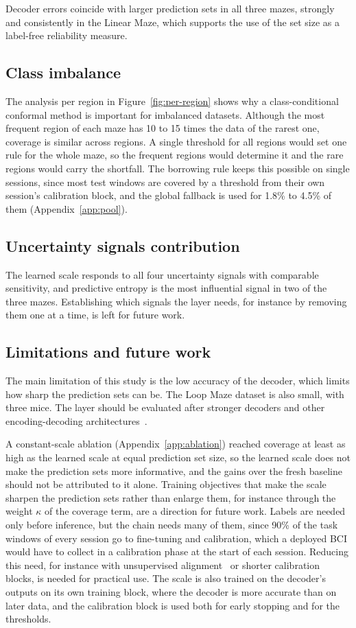 \documentclass{article}
\begin{document}
Decoder errors coincide with larger prediction sets in all three mazes, strongly and consistently in the Linear Maze, which supports the use of the set size as a label-free reliability measure.

\subsection{Class imbalance}
The analysis per region in Figure~\ref{fig:per-region} shows why a class-conditional conformal method is important for imbalanced datasets. Although the most frequent region of each maze has 10 to 15 times the data of the rarest one, coverage is similar across regions. A single threshold for all regions would set one rule for the whole maze, so the frequent regions would determine it and the rare regions would carry the shortfall. The borrowing rule keeps this possible on single sessions, since most test windows are covered by a threshold from their own session's calibration block, and the global fallback is used for 1.8\% to 4.5\% of them (Appendix~\ref{app:pool}).

\subsection{Uncertainty signals contribution}
The learned scale responds to all four uncertainty signals with comparable sensitivity, and predictive entropy is the most influential signal in two of the three mazes. Establishing which signals the layer needs, for instance by removing them one at a time, is left for future work.

\subsection{Limitations and future work}
\label{sec:limitations}
The main limitation of this study is the low accuracy of the decoder, which limits how sharp the prediction sets can be. The Loop Maze dataset is also small, with three mice. The layer should be evaluated after stronger decoders and other encoding-decoding architectures~\cite{schneider2023a,azabou2023}.

A constant-scale ablation (Appendix~\ref{app:ablation}) reached coverage at least as high as the learned scale at equal prediction set size, so the learned scale does not make the prediction sets more informative, and the gains over the fresh baseline should not be attributed to it alone. Training objectives that make the scale sharpen the prediction sets rather than enlarge them, for instance through the weight $\kappa$ of the coverage term, are a direction for future work. Labels are needed only before inference, but the chain needs many of them, since 90\% of the task windows of every session go to fine-tuning and calibration, which a deployed BCI would have to collect in a calibration phase at the start of each session. Reducing this need, for instance with unsupervised alignment~\cite{degenhart2020a,karpowicz2025a} or shorter calibration blocks, is needed for practical use. The scale is also trained on the decoder's outputs on its own training block, where the decoder is more accurate than on later data, and the calibration block is used both for early stopping and for the thresholds.
\end{document}
